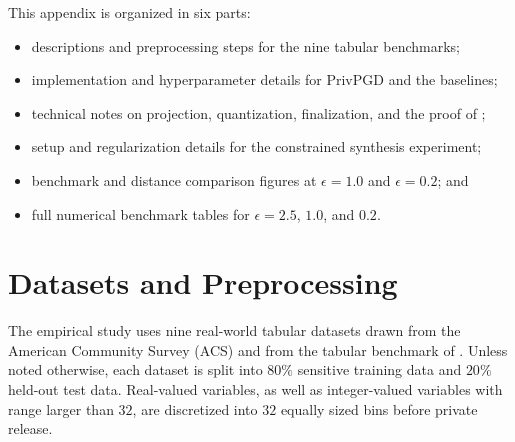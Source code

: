 \begin{tcolorbox}[
  enhanced,
  breakable,
  colback=gray!6,
  colframe=chaptercolor,
  boxrule=0.8pt,
  arc=3pt,
  title={Guide to Appendix~\ref{chap:appendix-privpgd}},
  colbacktitle=chaptercolor!12,
  coltitle=black
]
This appendix is organized in six parts:
\begin{itemize}
  \item descriptions and preprocessing steps for the nine tabular benchmarks;
  \item implementation and hyperparameter details for PrivPGD and the baselines;
  \item technical notes on projection, quantization, finalization, and the proof of ;
  \item setup and regularization details for the constrained synthesis experiment;
  \item benchmark and distance comparison figures at \(\epsilon = 1.0\) and \(\epsilon = 0.2\); and
  \item full numerical benchmark tables for \(\epsilon = 2.5\), \(1.0\), and \(0.2\).
\end{itemize}
\end{tcolorbox}

\section{Datasets and Preprocessing}
\label{app:privpgd-datasets}

The empirical study uses nine real-world tabular datasets drawn from the American Community Survey (ACS) and from the tabular benchmark of \citet{grinsztajn2022tree}. Unless noted otherwise, each dataset is split into \(80\%\) sensitive training data and \(20\%\) held-out test data. Real-valued variables, as well as integer-valued variables with range larger than \(32\), are discretized into \(32\) equally sized bins before private release.

